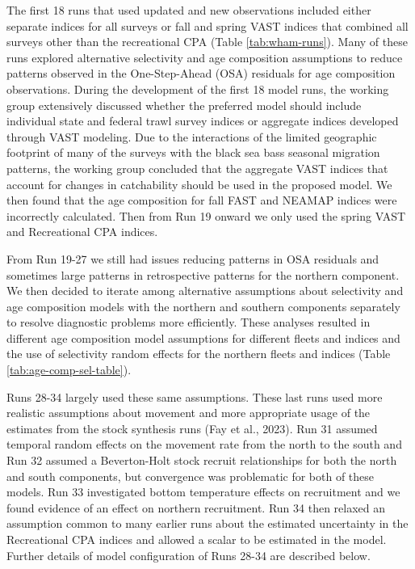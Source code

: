 \documentclass[
]{article}
\begin{document}
The first 18 runs that used updated and new observations included either separate indices for all surveys or fall and spring VAST indices that combined all surveys other than the recreational CPA (Table \ref{tab:wham-runs}). Many of these runs explored alternative selectivity and age composition assumptions to reduce patterns observed in the One-Step-Ahead (OSA) residuals for age composition observations. During the development of the first 18 model runs, the working group extensively discussed whether the preferred model should include individual state and federal trawl survey indices or aggregate indices developed through VAST modeling. Due to the interactions of the limited geographic footprint of many of the surveys with the black sea bass seasonal migration patterns, the working group concluded that the aggregate VAST indices that account for changes in catchability should be used in the proposed model.
We then found that the age composition for fall FAST and NEAMAP indices were incorrectly calculated. Then from Run 19 onward we only used the spring VAST and Recreational CPA indices.

From Run 19-27 we still had issues reducing patterns in OSA residuals and sometimes large patterns in retrospective patterns for the northern component. We then decided to iterate among alternative assumptions about selectivity and age composition models with the northern and southern components separately to resolve diagnostic problems more efficiently. These analyses resulted in different age composition model assumptions for different fleets and indices and the use of selectivity random effects for the northern fleets and indices (Table \ref{tab:age-comp-sel-table}).

Runs 28-34 largely used these same assumptions. These last runs used more realistic assumptions about movement and more appropriate usage of the estimates from the stock synthesis runs (Fay et al., 2023). Run 31 assumed temporal random effects on the movement rate from the north to the south and Run 32 assumed a Beverton-Holt stock recruit relationships for both the north and south components, but convergence was problematic for both of these models. Run 33 investigated bottom temperature effects on recruitment and we found evidence of an effect on northern recruitment. Run 34 then relaxed an assumption common to many earlier runs about the estimated uncertainty in the Recreational CPA indices and allowed a scalar to be estimated in the model. Further details of model configuration of Runs 28-34 are described below.
\end{document}
